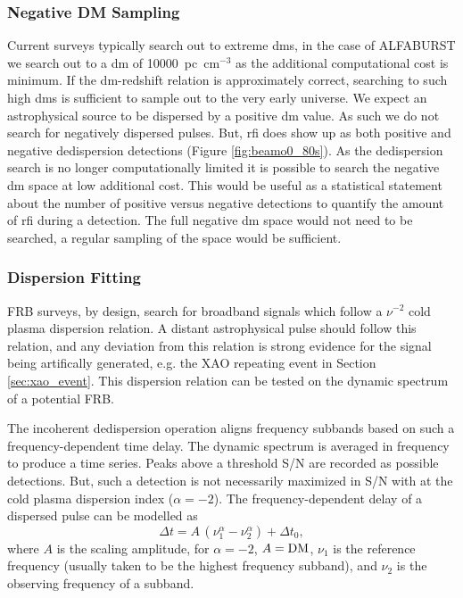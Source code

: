 \documentclass[a4paper,fleqn,usenatbib]{mnras}
\begin{document}
\subsubsection{Negative DM Sampling}

Current surveys typically search out to extreme \glspl{dm}, in the case of
ALFABURST we search out to a \gls{dm} of 10000~pc~cm$^{-3}$ as the additional
computational cost is minimum. If the \gls{dm}-redshift relation is
approximately correct, searching to such high \glspl{dm} is sufficient to sample
out to the very early universe. We expect an astrophysical source to be
dispersed by a positive \gls{dm} value. As such we do not search for negatively
dispersed pulses. But, \gls{rfi} does show up as both positive and negative
dedispersion detections (Figure \ref{fig:beamo0_80s}). As the dedispersion
search is no longer computationally limited it is possible to search the
negative \gls{dm} space at low additional cost. This would be useful as a
statistical statement about the number of positive versus negative detections to
quantify the amount of \gls{rfi} during a detection. The full negative \gls{dm}
space would not need to be searched, a regular sampling of the space would be
sufficient.

\subsubsection{Dispersion Fitting}

FRB surveys, by design, search for broadband signals which follow a $\nu^{-2}$
cold plasma dispersion relation. A distant astrophysical pulse should follow
this relation, and any deviation from this relation is strong evidence for the
signal being artifically generated, e.g. the XAO repeating event in Section
\ref{sec:xao_event}. This dispersion relation can be tested on the dynamic
spectrum of a potential FRB.

The incoherent dedispersion operation aligns frequency subbands based on such a
frequency-dependent time delay. The dynamic spectrum is averaged in frequency to
produce a time series. Peaks above a threshold S/N are recorded as possible
detections. But, such a detection is not necessarily maximized in S/N with at
the cold plasma dispersion index ($\alpha = -2$). The frequency-dependent delay
of a dispersed pulse can be modelled as
%
\begin{equation}
\Delta t = A \, (\nu_1^{\alpha} - \nu_2^{\alpha}) + \Delta t_0,
\end{equation}
%
where $A$ is the scaling amplitude, for $\alpha = -2$, $A = {\rm DM}$, $\nu_1$
is the reference frequency (usually taken to be the highest frequency subband),
and $\nu_2$ is the observing frequency of a subband.
\end{document}
